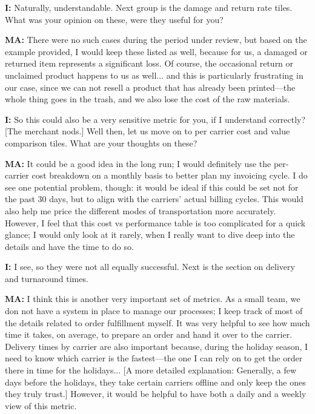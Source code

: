 \documentclass{imc-inf}
\begin{document}
\begin{appendices}
  \noindent\textbf{I:} Naturally, understandable. Next group is the damage and return rate tiles. What was your opinion on these, were they useful for you?

  \noindent\textbf{MA:} There were no such cases during the period under review, but based on the example provided, I would keep these listed as well, because for us, a damaged or returned item represents a significant loss. Of course, the occasional return or unclaimed product happens to us as well... and this is particularly frustrating in our case, since we can not resell a product that has already been printed—the whole thing goes in the trash, and we also lose the cost of the raw materials.

  \noindent\textbf{I:} So this could also be a very sensitive metric for you, if I understand correctly? [The merchant nods.] Well then, let us move on to per carrier cost and value comparison tiles. What are your thoughts on these?

  \noindent\textbf{MA:} It could be a good idea in the long run; I would definitely use the per-carrier cost breakdown on a monthly basis to better plan my invoicing cycle. I do see one potential problem, though: it would be ideal if this could be set not for the past 30 days, but to align with the carriers' actual billing cycles. This would also help me price the different modes of transportation more accurately. However, I feel that this cost vs performance table is too complicated for a quick glance; I would only look at it rarely, when I really want to dive deep into the details and have the time to do so.

  \noindent\textbf{I:} I see, so they were not all equally successful. Next is the section on delivery and turnaround times.

  \noindent\textbf{MA:} I think this is another very important set of metrics. As a small team, we don not have a system in place to manage our processes; I keep track of most of the details related to order fulfillment myself. It was very helpful to see how much time it takes, on average, to prepare an order and hand it over to the carrier. Delivery times by carrier are also important because, during the holiday season, I need to know which carrier is the fastest—the one I can rely on to get the order there in time for the holidays... [A more detailed explanation: Generally, a few days before the holidays, they take certain carriers offline and only keep the ones they truly trust.] However, it would be helpful to have both a daily and a weekly view of this metric.


\end{appendices}
\end{document}
